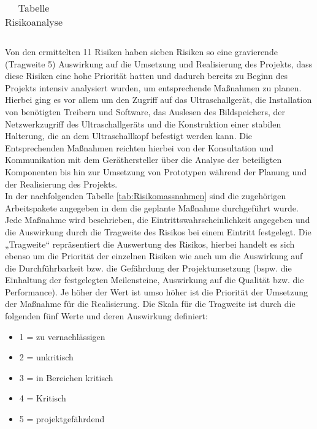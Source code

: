 \begin{center}
\begin{table} [H]
\begin{tabular}{ | p{} | p{} | p{} |}
    \end{tabular}
     \label{tab:Risikoanalyse}
     \caption{{\small Tabelle Risikoanalyse}}
    \end{table}
\end{center}
Von den ermittelten 11 Risiken haben sieben Risiken so eine gravierende (Tragweite 5) Auswirkung auf die Umsetzung und Realisierung des Projekts, dass diese Risiken eine hohe Priorität hatten und dadurch bereits zu Beginn des Projekts intensiv analysiert wurden, um entsprechende Maßnahmen zu planen. Hierbei ging es vor allem um den Zugriff auf das Ultraschallgerät, die Installation von benötigten Treibern und Software, das Auslesen des Bildspeichers, der Netzwerkzugriff des Ultraschallgeräts und die Konstruktion einer stabilen Halterung, die an dem Ultraschallkopf befestigt werden kann. Die Entsprechenden Maßnahmen reichten hierbei von der Konsultation und Kommunikation mit dem Geräthersteller über die Analyse der beteiligten Komponenten bis hin zur Umsetzung von Prototypen während der Planung und der Realisierung des Projekts.  \\

In der nachfolgenden Tabelle \ref{tab:Risikomassnahmen} sind die zugehörigen Arbeitspakete angegeben in dem die geplante Maßnahme durchgeführt wurde. Jede Maßnahme wird beschrieben, die Eintrittswahrscheinlichkeit angegeben und die Auswirkung durch die Tragweite des Risikos bei einem Eintritt festgelegt. 
Die „Tragweite“ repräsentiert die Auswertung des Risikos, hierbei handelt es sich ebenso um die Priorität der einzelnen Risiken wie auch um die Auswirkung auf die Durchführbarkeit bzw. die Gefährdung der Projektumsetzung (bspw. die Einhaltung der festgelegten Meilensteine, Auswirkung auf die Qualität bzw. die Performance). Je höher der Wert ist umso höher ist die Priorität der Umsetzung der Maßnahme für die Realisierung. Die Skala für die Tragweite ist durch die folgenden fünf Werte und deren Auswirkung definiert:\\
\begin{minipage}{\textwidth}
\begin{itemize}
\item 1 = zu vernachlässigen
\item 2 = unkritisch
\item 3 = in Bereichen kritisch
\item 4 = Kritisch
\item 5 = projektgefährdend
\end{itemize}
\end{minipage}


